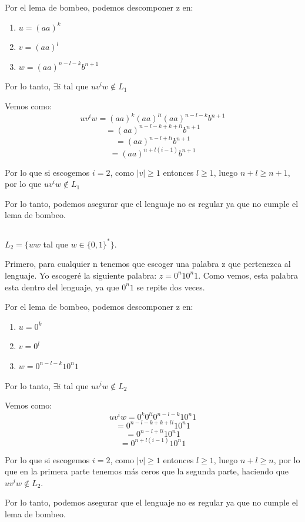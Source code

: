 \documentclass[12pt, spanish]{article}
\begin{document}
Por el lema de bombeo, podemos descomponer z en:

\begin{enumerate}
	\item $u = (aa)^k$
	\item $v = (aa)^l$
	\item $w = (aa)^{n - l - k}b^{n+1}$
\end{enumerate}

Por lo tanto, $\exists i$ tal que $uv^iw \not \in L_1$

\newpage

Vemos como:
	$$uv^iw = (aa)^k(aa)^{li}(aa)^{n-l-k}b^{n+1}$$ 
	$$ =  (aa)^{n - l - k + k + li}b^{n+1} $$
	$$ =  (aa)^{n - l  + li}b^{n+1}$$
	$$ =  (aa)^{n + l(i - 1)}b^{n+1}  $$

Por lo que si escogemos $i = 2$, como $|v| \geq 1$ entonces $l \geq 1$, luego $n+l \geq n+1$, por lo que $uv^iw \not \in L_1$

Por lo tanto, podemos asegurar que el lenguaje no es regular ya que no cumple el lema de bombeo.


\subsection{}
 $L_2 = \{ ww $ tal que  $ w \in \{0,1\}^* \}$.
 
Primero, para cualquier n tenemos que escoger una palabra z que pertenezca al lenguaje. Yo escogeré la siguiente palabra: $z = 0^n10^n1$. Como vemos, esta palabra esta dentro del lenguaje, ya que $0^n1$ se repite dos veces.

Por el lema de bombeo, podemos descomponer z en:

\begin{enumerate}
	\item $u = 0^k$
	\item $v = 0^l$
	\item $w =0^{n - l - k}10^n1$
\end{enumerate}

Por lo tanto, $\exists i$ tal que $uv^iw \not \in L_2$

Vemos como:
	$$uv^iw = 0^k0^{li}0^{n-l-k}10^n1$$ 
	$$ =  0^{n - l - k + k + li}10^n1 $$
	$$ =  0^{n - l  + li}10^n1$$
	$$ =  0^{n + l(i - 1)}10^n1  $$

Por lo que si escogemos $i = 2$, como $|v| \geq 1$ entonces $l \geq 1$, luego $n+l \geq n$, por lo que en la primera parte tenemos más ceros que la segunda parte, haciendo que $uv^iw \not \in L_2$.

Por lo tanto, podemos asegurar que el lenguaje no es regular ya que no cumple el lema de bombeo.
\end{document}
